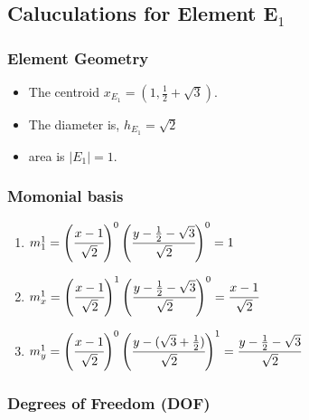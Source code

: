 \documentclass{article}
\begin{document}
\subsection{Caluculations for Element E$_1$}

\subsubsection{Element Geometry}
\begin{itemize}
    \item The centroid $x_{E_1} = (1, \frac{1}{2}+\sqrt{3}).$
    \item The diameter is, $ h_{E_1} = \sqrt{2}$
    \item area is $|E_1| = 1$.
\end{itemize}

\subsubsection{Momonial basis}

\begin{enumerate}
    \item $m_1^1 = \left(\cfrac{x - 1}{\sqrt{2}}\right)^{0}\left(\cfrac{y -\frac{1}{2} - \sqrt{3}}{\sqrt{2}}\right)^{0} = 1$
    
    \item $m_x^1 = \left(\cfrac{x - 1}{\sqrt{2}}\right)^{1}\left(\cfrac{y -\frac{1}{2} - \sqrt{3}}{\sqrt{2}}\right)^{0} = \cfrac{x - 1}{\sqrt{2}}$

    \item $m_y^1 = \left(\cfrac{x - 1}{\sqrt{2}}\right)^{0}\left(\cfrac{y -(\sqrt{3} +\frac{1}{2})}{\sqrt{2}}\right)^{1} = \cfrac{y - \frac{1}{2} - \sqrt{3}}{\sqrt{2}}$
\end{enumerate}


\subsubsection{Degrees of Freedom (DOF)}
\end{document}
